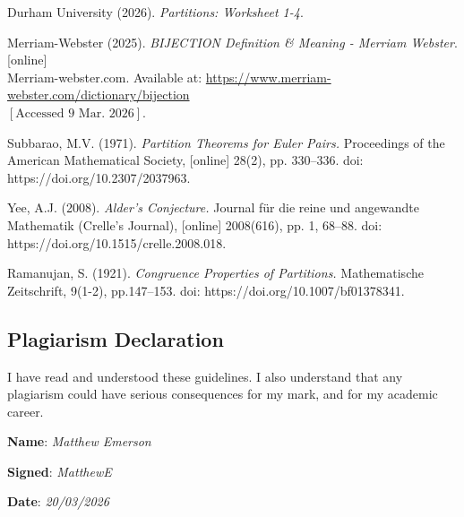 \documentclass{article}
\newcommand{\separate}[1] {\vspace{#1 pt}\noindent}
\begin{document}
Durham University (2026). \textit{Partitions: Worksheet 1-4}.\label{cit:1}

\separate{10}Merriam-Webster (2025). \textit{BIJECTION Definition \& Meaning - Merriam Webster}. [online] \\ Merriam-webster.com. Available at: \hyperlink{https://www.merriam-webster.com/dictionary/bijection}{https://www.merriam-webster.com/dictionary/bijection} \\ \([\text{Accessed 9 Mar. 2026}]\).\label{cit:2}

\separate{10}Subbarao, M.V. (1971). \textit{Partition Theorems for Euler Pairs.} Proceedings of the American Mathematical Society, [online] 28(2), pp. 330–336. doi: https://doi.org/10.2307/2037963.\label{cit:3}

\separate{10}Yee, A.J. (2008). \textit{Alder’s Conjecture.} Journal für die reine und angewandte Mathematik (Crelle's Journal), [online] 2008(616), pp. 1, 68–88. doi: https://doi.org/10.1515/crelle.2008.018.\label{cit:4}

\separate{10}Ramanujan, S. (1921). \textit{Congruence Properties of Partitions.} Mathematische Zeitschrift, 9(1-2), pp.147–153. doi: https://doi.org/10.1007/bf01378341.\label{cit:5}

\separate{350}\noindent\makebox[\linewidth]{\rule{\linewidth}{0.4pt}}

\subsection*{Plagiarism Declaration}

I have read and understood these guidelines. I also understand that any plagiarism could have serious
consequences for my mark, and for my academic career. 

\separate{3}\textbf{Name}: \textit{Matthew Emerson} 

\separate{3}\textbf{Signed}: \textit{MatthewE} 

\separate{3}\textbf{Date}: \textit{20/03/2026}
\end{document}
